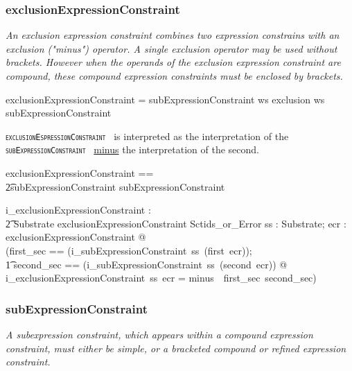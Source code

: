 \documentclass{article}
\def\spec#1{{\tt \small \textsc{{#1}} }}
\def\bnf#1{{\scriptsize {{#1}} }}
\def\desc#1{{\small \textsl{{#1}} }}
\begin{document}
\subsubsection{exclusionExpressionConstraint}
\begin{framed}
\desc{An exclusion expression constraint combines two expression constrains with an exclusion ("minus") operator. A single exclusion operator may be used without brackets. However when the operands of the exclusion expression constraint are compound, these compound expression constraints must be enclosed by brackets.}
\end{framed}

\begin{framed}
\noindent
\bnf{exclusionExpressionConstraint = subExpressionConstraint ws exclusion ws subExpressionConstraint}
\end{framed}

\spec{exclusionEspressionConstraint} is interpreted as the  interpretation of the
\spec{subExpressionConstraint} \underline{minus} the interpretation of the second.

\begin{zed}
exclusionExpressionConstraint == \\ 
\t2subExpressionConstraint \cross subExpressionConstraint
\end{zed}

\begin{gendef}
    i\_exclusionExpressionConstraint : \\
\t2 Substrate \fun exclusionExpressionConstraint \fun Sctids\_or\_Error
\where
   \forall ss : Substrate; ecr : exclusionExpressionConstraint @ \\
   (\LET first\_sec == (i\_subExpressionConstraint~ss~(first~ecr)); \\
   \t1 second\_sec == (i\_subExpressionConstraint~ss~(second~ecr)) @ \\
i\_exclusionExpressionConstraint~ss~ecr =  minus~~first\_sec~second\_sec)
\end{gendef}

\subsubsection{subExpressionConstraint}
\begin{framed}
\desc{A subexpression constraint, which appears within a compound expression constraint, must either be simple, or a bracketed compound or refined expression constraint.}
\end{framed}
\end{document}
